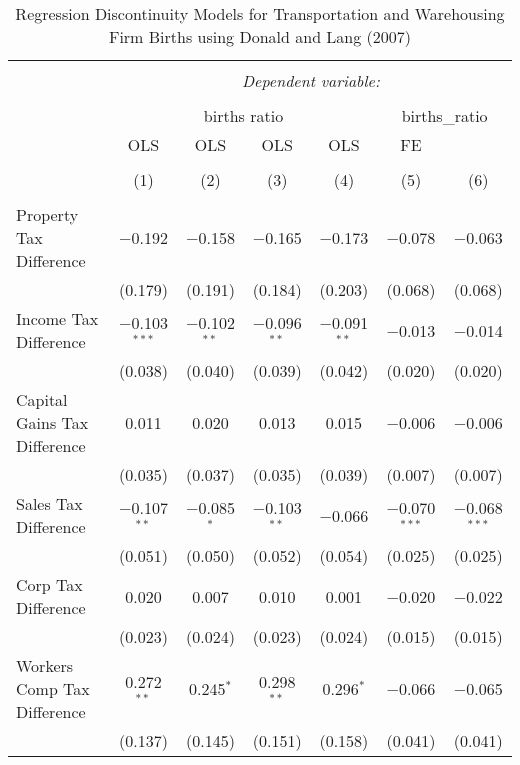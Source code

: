 
\begin{table}[!htbp] \centering 
  \caption{Regression Discontinuity Models for  Transportation and Warehousing Firm Births using Donald and Lang (2007)} 
  \label{} 
\begin{tabular}{@{\extracolsep{5pt}}lcccccc} 
\\[-1.8ex]\hline 
\hline \\[-1.8ex] 
 & \multicolumn{6}{c}{\textit{Dependent variable:}} \\ 
\cline{2-7} 
\\[-1.8ex] & \multicolumn{4}{c}{births ratio} & \multicolumn{2}{c}{births\_ratio} \\ 
 & OLS & OLS & OLS & OLS & FE &  \\ 
\\[-1.8ex] & (1) & (2) & (3) & (4) & (5) & (6)\\ 
\hline \\[-1.8ex] 
 Property Tax Difference & $-$0.192 & $-$0.158 & $-$0.165 & $-$0.173 & $-$0.078 & $-$0.063 \\ 
  & (0.179) & (0.191) & (0.184) & (0.203) & (0.068) & (0.068) \\ 
  Income Tax Difference & $-$0.103$^{***}$ & $-$0.102$^{**}$ & $-$0.096$^{**}$ & $-$0.091$^{**}$ & $-$0.013 & $-$0.014 \\ 
  & (0.038) & (0.040) & (0.039) & (0.042) & (0.020) & (0.020) \\ 
  Capital Gains Tax Difference & 0.011 & 0.020 & 0.013 & 0.015 & $-$0.006 & $-$0.006 \\ 
  & (0.035) & (0.037) & (0.035) & (0.039) & (0.007) & (0.007) \\ 
  Sales Tax Difference & $-$0.107$^{**}$ & $-$0.085$^{*}$ & $-$0.103$^{**}$ & $-$0.066 & $-$0.070$^{***}$ & $-$0.068$^{***}$ \\ 
  & (0.051) & (0.050) & (0.052) & (0.054) & (0.025) & (0.025) \\ 
  Corp Tax Difference & 0.020 & 0.007 & 0.010 & 0.001 & $-$0.020 & $-$0.022 \\ 
  & (0.023) & (0.024) & (0.023) & (0.024) & (0.015) & (0.015) \\ 
  Workers Comp Tax Difference & 0.272$^{**}$ & 0.245$^{*}$ & 0.298$^{**}$ & 0.296$^{*}$ & $-$0.066 & $-$0.065 \\ 
  & (0.137) & (0.145) & (0.151) & (0.158) & (0.041) & (0.041) \\ 

\end{tabular}
\end{table}
